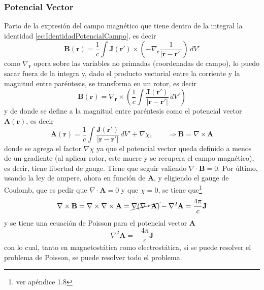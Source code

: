 \subsubsection{Potencial Vector}
Parto de la expresión del campo magnético que tiene dentro de la integral la identidad \eqref{ec:IdentidadPotencialCampo}, es decir
\begin{equation*}
    \textbf{B}(\textbf{r})
    = \frac{1}{c}\int
    \textbf{J}(\textbf{r}')\times
    \left(
        -\nabla_{\textbf{r}}\frac{1}{|\textbf{r}-\textbf{r}'|}
    \right)\,dV'
\end{equation*}
como $\nabla_{\textbf{r}}$ opera sobre las variables no primadas (coordenadas de campo), lo puedo sacar fuera de la integra y, dado el producto vectorial entre la corriente y la magnitud entre paréntesis, se transforma en un rotor, es decir
\begin{equation*}
    \textbf{B}(\textbf{r}) = 
    \nabla_{\textbf{r}}\times
    \left(
        \frac{1}{c}
        \int
        \frac{\textbf{J}(\textbf{r}')}{|\textbf{r}-\textbf{r}'|}\,dV'
    \right)
\end{equation*}
y de donde se define a la magnitud entre paréntesis como el potencial vector $\textbf{A}(\textbf{r})$, es decir
\begin{equation}
    \textbf{A}(\textbf{r}) =
    \frac{1}{c}
    \int
    \frac{\textbf{J}(\textbf{r}')}{|\textbf{r}-\textbf{r}'|}\,dV'
    + \nabla \chi,
    \quad
    \quad
    \Longrightarrow
    \textbf{B} = \nabla \times \textbf{A}
        \label{ec:PotencialVector}
\end{equation}
donde se agrega el factor $\nabla \chi$ ya que el potencial vector queda definido a menos de un gradiente (al aplicar rotor, este muere y se recupera el campo magnético), es decir, tiene libertad de gauge. Tiene que seguir valiendo $\nabla \cdot \textbf{B} = 0$. Por último, usando la ley de ampere, ahora en función de \textbf{A}, y eligiendo el gauge de Coulomb, que es pedir que $\nabla \cdot \textbf{A} = 0$ y que $\chi = 0$, se tiene que\footnote{ver apéndice 1.8}
\begin{equation*}
    \nabla \times \textbf{B} 
    = \nabla \times \nabla \times \textbf{A} 
    = \cancel{\nabla (\nabla \cdot \textbf{A})} - \nabla^{2}\textbf{A}
    = \frac{4\pi}{c}\textbf{J}
\end{equation*}
y se tiene una ecuación de Poisson para el potencial vector $\textbf{A}$
\begin{equation}
    \nabla^{2}\textbf{A} = -\frac{4\pi}{c}\textbf{J}
        \label{ec:PoissonPotencialVector}
\end{equation}
con lo cual, tanto en magnetostática como electrostática, si se puede resolver el problema de Poisson, se puede resolver todo el problema.


